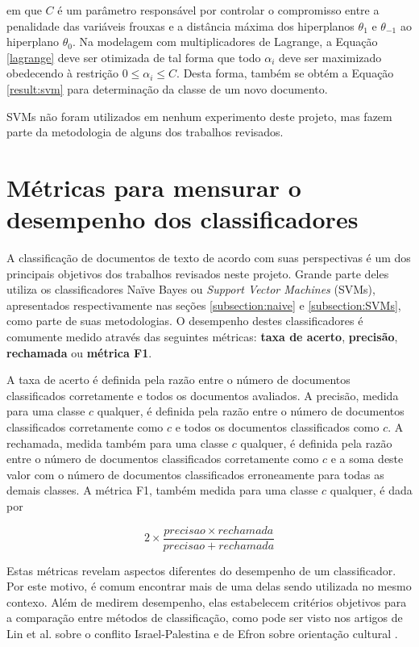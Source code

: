 em que \ensuremath{C} é um parâmetro responsável por controlar o compromisso entre a penalidade das variáveis frouxas e a distância máxima dos hiperplanos \ensuremath{\theta_1} e \ensuremath{\theta_{-1}} ao hiperplano \ensuremath{\theta_0}. Na modelagem com multiplicadores de Lagrange, a Equação \ref{lagrange} deve ser otimizada de tal forma que todo \ensuremath{\alpha_i} deve ser maximizado obedecendo à restrição \ensuremath{0 \leq \alpha_i \leq C}. Desta forma, também se obtém a Equação \ref{result:svm} para determinação da classe de um novo documento.

SVMs não foram utilizados em nenhum experimento deste projeto, mas fazem parte da metodologia de alguns dos trabalhos revisados.


\section{Métricas para mensurar o desempenho dos classificadores}

A classificação de documentos de texto de acordo com suas perspectivas é um dos principais objetivos dos trabalhos revisados neste projeto. Grande parte deles utiliza os classificadores Naïve Bayes ou \emph{Support Vector Machines} (SVMs), apresentados respectivamente nas seções \ref{subsection:naive} e \ref{subsection:SVMs}, como parte de suas metodologias. O desempenho destes classificadores é comumente medido através das seguintes métricas: \textbf{taxa de acerto}, \textbf{precisão}, \textbf{rechamada} ou \textbf{métrica F1}.

A taxa de acerto é definida pela razão entre o número de documentos classificados corretamente e todos os documentos avaliados. A precisão, medida para uma classe \ensuremath{c} qualquer, é definida pela razão entre o número de documentos classificados corretamente como \ensuremath{c} e todos os documentos classificados como \ensuremath{c}. A rechamada, medida também para uma classe \ensuremath{c} qualquer, é definida pela razão entre o número de documentos classificados corretamente como \ensuremath{c} e a soma deste valor com o número de documentos classificados erroneamente para todas as demais classes. A métrica F1, também medida para uma classe \ensuremath{c} qualquer, é dada por

\begin{equation}
\ensuremath{2 \times \frac{precisao \times rechamada}{precisao + rechamada}}
\end{equation} 

Estas métricas revelam aspectos diferentes do desempenho de um classificador. Por este motivo, é comum encontrar mais de uma delas sendo utilizada no mesmo contexo. Além de medirem desempenho, elas estabelecem critérios objetivos para a comparação entre métodos de classificação, como pode ser visto nos artigos de Lin et al. sobre o conflito Israel-Palestina \cite{lin-et-al2006} e de Efron sobre orientação cultural \cite{efron}. 


